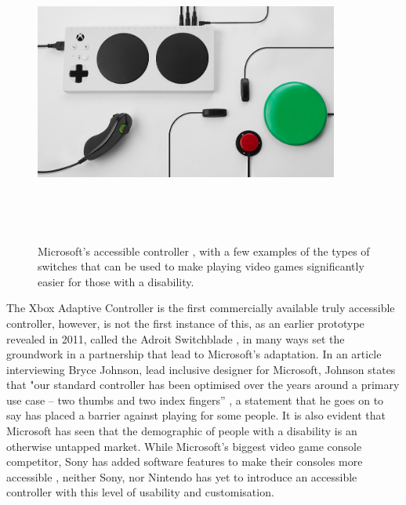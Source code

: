 \begin{figure} [h]
    \centering
    \includegraphics[width=10cm,height=10cm,keepaspectratio]{Figures/accessible_controller.png}
    \caption{Microsoft's accessible controller \cite{adaptive}, with a few examples of the types of switches that can be used to make playing video games significantly easier for those with a disability.}
    \label{fig:Jellybean}
\end{figure}

The Xbox Adaptive Controller is the first commercially available truly accessible controller, however, is not the first instance of this, as an earlier prototype revealed in 2011, called the Adroit Switchblade \cite{ablegamer}, in many ways set the groundwork in a partnership that lead to Microsoft's adaptation.
In an article interviewing Bryce Johnson, lead inclusive designer for Microsoft, Johnson states that "our standard controller has been optimised over the years around a primary use case – two thumbs and two index fingers” \cite{disabilitygaming}, a statement that he goes on to say has placed a barrier against playing for some people.
It is also evident that Microsoft has seen that the demographic of people with a disability is an otherwise untapped market.
While Microsoft's biggest video game console competitor, Sony has added software features to make their consoles more accessible \cite{sony}, neither Sony, nor Nintendo has yet to introduce an accessible controller with this level of usability and customisation.


